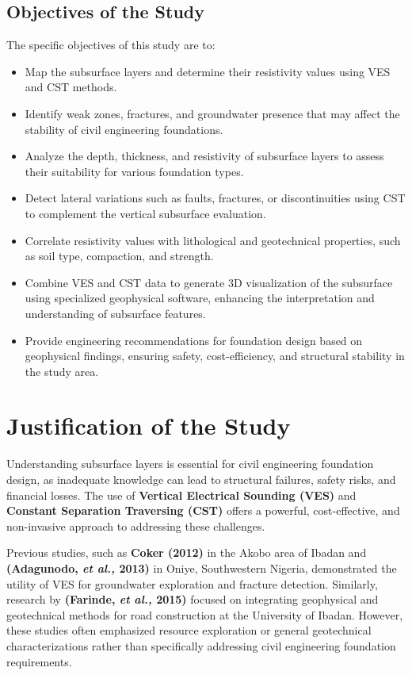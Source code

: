 \documentclass[12pt,a4paper]{report}
\begin{document}
\subsection{Objectives of the Study}
The specific objectives of this study are to:
\begin{itemize}
    \item Map the subsurface layers and determine their resistivity values using VES and CST methods.
    \item Identify weak zones, fractures, and groundwater presence that may affect the stability of civil engineering foundations.
    \item Analyze the depth, thickness, and resistivity of subsurface layers to assess their suitability for various foundation types.
    \item Detect lateral variations such as faults, fractures, or discontinuities using CST to complement the vertical subsurface evaluation.
    \item Correlate resistivity values with lithological and geotechnical properties, such as soil type, compaction, and strength.
    \item Combine VES and CST data to generate 3D visualization of the subsurface using specialized geophysical software, enhancing the interpretation and understanding of subsurface features.
    \item Provide engineering recommendations for foundation design based on geophysical findings, ensuring safety, cost-efficiency, and structural stability in the study area.
\end{itemize}

\section{Justification of the Study}
Understanding subsurface layers is essential for civil engineering foundation design, as inadequate knowledge can lead to structural failures, safety risks, and financial losses. The use of \textbf{Vertical Electrical Sounding (VES)} and \textbf{Constant Separation Traversing (CST)} offers a powerful, cost-effective, and non-invasive approach to addressing these challenges.

Previous studies, such as \textbf{Coker (2012)} in the Akobo area of Ibadan and \textbf{(Adagunodo, \textit{et al.,} 2013)} in Oniye, Southwestern Nigeria, demonstrated the utility of VES for groundwater exploration and fracture detection. Similarly, research by \textbf{(Farinde, \textit{et al.,} 2015)} focused on integrating geophysical and geotechnical methods for road construction at the University of Ibadan. However, these studies often emphasized resource exploration or general geotechnical characterizations rather than specifically addressing civil engineering foundation requirements.
\end{document}
